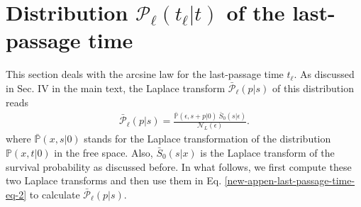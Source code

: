 \documentclass[superscriptaddress,amsmath,amssymb,aps,onecolumn]{revtex4}
\begin{document}
\section{Distribution $\mathcal{P}_{ \ell } \left( t_{\ell}|t \right)$ of the last-passage time}
\label{appen-dist-Pl}
This section deals with the arcsine law for the last-passage time $t_{\ell}$. As discussed in Sec. IV in the main text, the Laplace transform $\bar{\mathcal{P}}_{ \ell } \left( p|s \right)$ of this distribution reads
\begin{align}
\bar{\mathcal{P}}_{ \ell } \left( p|s \right) = \frac{\bar{\mathbb{P}}(\epsilon, s+p|0)~\bar{S}_0(s|\epsilon)}{\mathcal{N}_L(\epsilon)}. 
\label{new-appen-last-passage-time-eq-2}
\end{align}
where $\bar{\mathbb{P}}(x, s|0)$ stands for the Laplace transformation of the distribution $\mathbb{P}(x,t|0)$ in the free space. Also, $\bar{S}_0(s|x)$ is the Laplace transform of the survival probability as discussed before. In what follows, we first compute these two Laplace transforms and then use them in Eq. \eqref{new-appen-last-passage-time-eq-2} to calculate $\bar{\mathcal{P}}_{ \ell } \left( p|s \right)$.
\end{document}
